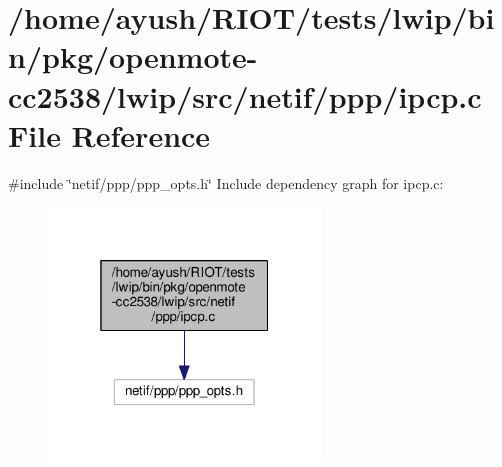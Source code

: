 \hypertarget{openmote-cc2538_2lwip_2src_2netif_2ppp_2ipcp_8c}{}\section{/home/ayush/\+R\+I\+O\+T/tests/lwip/bin/pkg/openmote-\/cc2538/lwip/src/netif/ppp/ipcp.c File Reference}
\label{openmote-cc2538_2lwip_2src_2netif_2ppp_2ipcp_8c}
{\ttfamily \#include \char`\"{}netif/ppp/ppp\+\_\+opts.\+h\char`\"{}}\newline
Include dependency graph for ipcp.\+c\+:
\nopagebreak
\begin{figure}[H]
\begin{center}
\leavevmode
\includegraphics[width=205pt]{openmote-cc2538_2lwip_2src_2netif_2ppp_2ipcp_8c__incl}
\end{center}
\end{figure}
